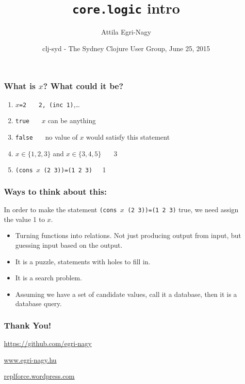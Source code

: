 \documentclass{beamer}
\begin{document}
\title[core.logic.intro]{\texttt{core.logic} intro}
\author[e-n@]{Attila Egri-Nagy}
\date[(nth clj-syd 31)]{clj-syd - The Sydney Clojure User Group, June 25, 2015}

\maketitle

\begin{frame}\frametitle{What is $x$? What could it be?}
\begin{enumerate}
\item $x$\texttt{=2} \pause\ \ \ \texttt{2, (inc 1)},\ldots\pause
\item \texttt{true} \pause\ \ \ $x$ can be anything\pause
\item \texttt{false} \pause\ \ \ no value of $x$ would satisfy this
  statement\pause
\item $x\in\{1,2,3\}$ and $x\in\{3,4,5\}$ \pause\ \ \ 3\pause
\item \texttt{(cons $x$ (2 3))=(1 2 3)}\pause\ \ \ 1\pause
\end{enumerate}
\end{frame}


\begin{frame}\frametitle{Ways to think about this:}
In order to make the statement \texttt{(cons $x$ (2 3))=(1 2 3)} true,
we need assign the value 1 to $x$.

\begin{itemize}
\item Turning functions into relations. Not just producing output from
  input, but guessing input based on the output.
\item It is a puzzle, statements with holes to fill in.
\item It is a search problem.
\item Assuming we have a set of candidate values, call it a database,
  then it is a database query.
\end{itemize}
\end{frame}

\begin{frame}\frametitle{Thank You!}
\begin{center}
\huge
\url{https://github.com/egri-nagy}

\url{www.egri-nagy.hu}

\url{replforce.wordpress.com}

\end{center}
\end{frame}
\end{document}
